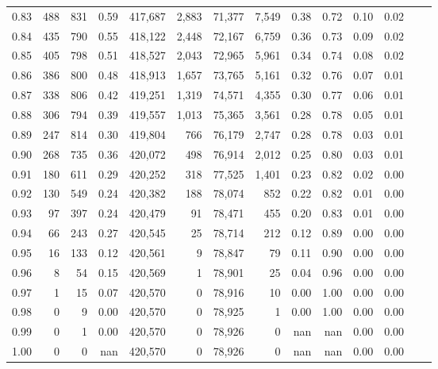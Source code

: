 \begin{tabular}{rrrrrrrrrrrrrr}
0.83 &    488 &    831 &    0.59 &  417,687 &    2,883 &  71,377 &   7,549 &  0.38 &  0.72 &  0.10 &      0.02 \\
0.84 &    435 &    790 &    0.55 &  418,122 &    2,448 &  72,167 &   6,759 &  0.36 &  0.73 &  0.09 &      0.02 \\
0.85 &    405 &    798 &    0.51 &  418,527 &    2,043 &  72,965 &   5,961 &  0.34 &  0.74 &  0.08 &      0.02 \\
0.86 &    386 &    800 &    0.48 &  418,913 &    1,657 &  73,765 &   5,161 &  0.32 &  0.76 &  0.07 &      0.01 \\
0.87 &    338 &    806 &    0.42 &  419,251 &    1,319 &  74,571 &   4,355 &  0.30 &  0.77 &  0.06 &      0.01 \\
0.88 &    306 &    794 &    0.39 &  419,557 &    1,013 &  75,365 &   3,561 &  0.28 &  0.78 &  0.05 &      0.01 \\
0.89 &    247 &    814 &    0.30 &  419,804 &      766 &  76,179 &   2,747 &  0.28 &  0.78 &  0.03 &      0.01 \\
0.90 &    268 &    735 &    0.36 &  420,072 &      498 &  76,914 &   2,012 &  0.25 &  0.80 &  0.03 &      0.01 \\
0.91 &    180 &    611 &    0.29 &  420,252 &      318 &  77,525 &   1,401 &  0.23 &  0.82 &  0.02 &      0.00 \\
0.92 &    130 &    549 &    0.24 &  420,382 &      188 &  78,074 &     852 &  0.22 &  0.82 &  0.01 &      0.00 \\
0.93 &     97 &    397 &    0.24 &  420,479 &       91 &  78,471 &     455 &  0.20 &  0.83 &  0.01 &      0.00 \\
0.94 &     66 &    243 &    0.27 &  420,545 &       25 &  78,714 &     212 &  0.12 &  0.89 &  0.00 &      0.00 \\
0.95 &     16 &    133 &    0.12 &  420,561 &        9 &  78,847 &      79 &  0.11 &  0.90 &  0.00 &      0.00 \\
0.96 &      8 &     54 &    0.15 &  420,569 &        1 &  78,901 &      25 &  0.04 &  0.96 &  0.00 &      0.00 \\
0.97 &      1 &     15 &    0.07 &  420,570 &        0 &  78,916 &      10 &  0.00 &  1.00 &  0.00 &      0.00 \\
0.98 &      0 &      9 &    0.00 &  420,570 &        0 &  78,925 &       1 &  0.00 &  1.00 &  0.00 &      0.00 \\
0.99 &      0 &      1 &    0.00 &  420,570 &        0 &  78,926 &       0 &   nan &   nan &  0.00 &      0.00 \\
1.00 &      0 &      0 &     nan &  420,570 &        0 &  78,926 &       0 &   nan &   nan &  0.00 &      0.00 \\
\bottomrule
\end{tabular}
